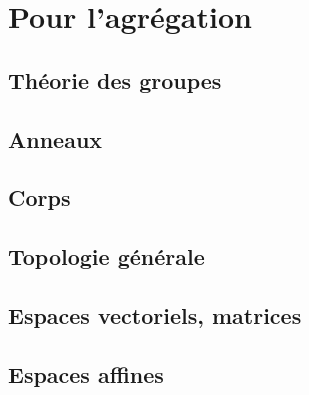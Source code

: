 



\makeindex
\makenomenclature





\setcounter{isCC}{0}        %

    

\tableofcontents

\newpage




\part{Pour l'agrégation}

\chapter{Théorie des groupes}



\chapter{Anneaux}


\chapter{Corps}


\chapter{Topologie générale}


\chapter{Espaces vectoriels, matrices}



\chapter{Espaces affines}


